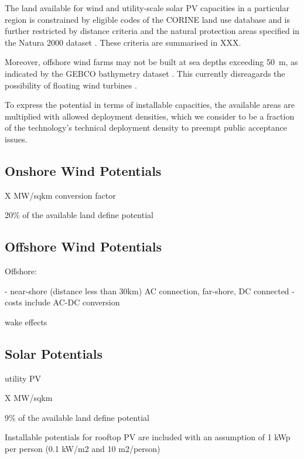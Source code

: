 The land available for wind and utility-scale solar PV capacities in a particular region is constrained by eligible codes of the CORINE land use database \citeS{} and is further restricted by distance criteria
and the natural protection areas specified in the Natura 2000 dataset \citeS{}. These criteria are summarised in XXX.

Moreover, offshore wind farms may not be built at sea depths exceeding \SI{50}{\metre}, as indicated by the GEBCO bathymetry dataset \citeS{}.
This currently disreagards the possibility of floating wind turbines .

To express the potential in terms of installable capacities, the available areas are multiplied with allowed deployment densities,
which we consider to be a fraction of the technology's technical deployment density to preempt public acceptance issues.

\subsection{Onshore Wind Potentials}

X MW/sqkm conversion factor

20\% of the available land define potential


\subsection{Offshore Wind Potentials}

Offshore:

- near-shore (distance less than 30km) AC connection, far-shore, DC connected
- costs include AC-DC conversion

wake effects


\subsection{Solar Potentials}

utility PV

X MW/sqkm

9\% of the available land define potential

Installable potentials for rooftop PV are included with an assumption of 1 kWp
per person (0.1 kW/m2 and 10 m2/person)

